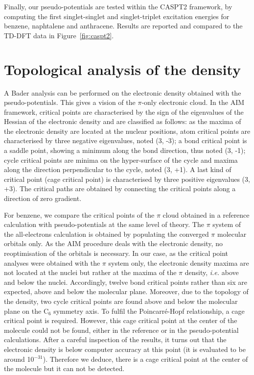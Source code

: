 \documentclass[12pt]{article}
\begin{document}
Finally, our pseudo-potentials are tested within the CASPT2 framework, by computing the first 
singlet-singlet and singlet-triplet excitation energies for benzene, naphtalene and anthracene. Results are
reported and compared to the TD-DFT data in Figure~\ref{fig:caspt2}. 


\section*{\sffamily \large Topological analysis of the density}
A Bader analysis can be performed on the electronic density obtained with the pseudo-potentials.\cite{bader}
This gives a vision of the $\pi$-only electronic cloud.
In the AIM framework, critical points are characterised by the sign of the eigenvalues of the Hessian of 
the electronic density and are classified as follows:
as the maxima of the electronic density are located at the nuclear positions,
atom critical points are characterised by three negative eigenvalues, noted (3, -3);
a bond critical point is a saddle point, showing a minimum along the bond direction,
thus noted (3, -1); cycle critical points are minima on the hyper-surface of the cycle
and maxima along the direction perpendicular to the cycle, noted (3, +1).
A last kind of critical point (cage critical point) is characterised by three positive eigenvalues
(3, +3).
The critical paths are obtained by connecting the critical points along a direction of zero gradient.

For benzene, we compare the critical points of the $\pi$ cloud obtained in a reference calculation
with pseudo-potentials at the same level of theory.
The $\pi$ system of the all-electrons calculation is obtained  by populating the converged $\pi$ molecular orbitals only.
As the AIM procedure deals with the electronic density, no reoptimisation of the orbitals is necessary.
In our case, as the critical point analyses were obtained
with the $\pi$ system only, the electronic density maxima are not
located at the nuclei but rather at the maxima of the $\pi$ density, 
\emph{i.e.} above and below the nuclei. %
Accordingly, twelve bond critical points rather than six are expected,
above and below the molecular plane.
Moreover, due to the topology of the density, two cycle critical points are found above and below the molecular
plane on the C$_6$ symmetry axis.
To fulfil the Poincarré-Hopf relationship, a cage critical point is required. However, this cage critical point 
at the center of the molecule could not be found, either in the reference or in the pseudo-potential 
calculations.
After a careful inspection of the results, it turns out that the electronic density
is below computer accuracy at this point (it is evaluated to be around 10$^{-31}$).
Therefore we deduce, there is a cage critical point at the center of
the molecule but it can not be detected.
\end{document}
